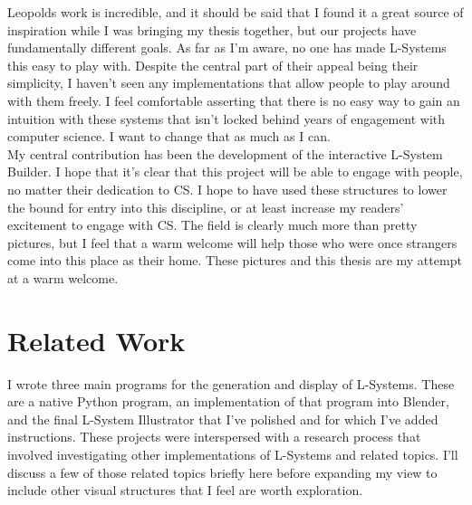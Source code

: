 \documentclass[12pt,twoside]{reedthesis}
\begin{document}
	Leopolds work is incredible, and it should be said that I found it a great source of inspiration while I was bringing my thesis together, but our projects have fundamentally different goals. As far as I'm aware, no one has made L-Systems this easy to play with. Despite the central part of their appeal being their simplicity, I haven't seen any implementations that allow people to play around with them freely. I feel comfortable asserting that there is no easy way to gain an intuition with these systems that isn't locked behind years of engagement with computer science. I want to change that as much as I can.\\
	
	My central contribution has been the development of the interactive L-System Builder. I hope that it's clear that this project will be able to engage with people, no matter their dedication to CS. I hope to have used these structures to lower the bound for entry into this discipline, or at least increase my readers’ excitement to engage with CS. The field is clearly much more than pretty pictures, but I feel that a warm welcome will help those who were once strangers come into this place as their home. These pictures and this thesis are my attempt at a warm welcome.\\
	

\section{Related Work}
	I wrote three main programs for the generation and display of L-Systems. These are a native Python program, an implementation of that program into Blender, and the final L-System Illustrator that I've polished and for which I've added instructions. These projects were interspersed with a research process that involved investigating other implementations of L-Systems and related topics. I'll discuss a few of those related topics briefly here before expanding my view to include other visual structures that I feel are worth exploration.\\
\end{document}
